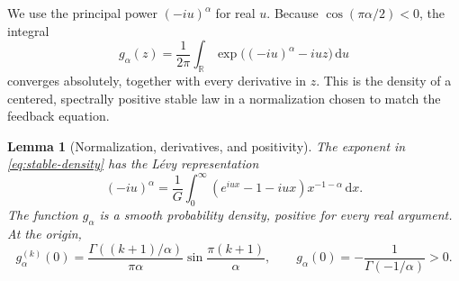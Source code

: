 \documentclass[11pt,a4paper]{article}
\numberwithin{equation}{section}
\newtheorem{lemma}[theorem]{Lemma}
\theoremstyle{definition}
\theoremstyle{remark}
\newcommand{\R}{\mathbb R}
\newcommand{\dd}{\,\mathrm d}
\begin{document}
We use the principal power $(-iu)^\alpha$ for real $u$. Because
$\cos(\pi\alpha/2)<0$, the integral
\begin{equation}\label{eq:stable-density}
 g_\alpha(z)=\frac1{2\pi}\int_{\R}
          \exp\bigl((-iu)^\alpha-iuz\bigr)\dd u
\end{equation}
converges absolutely, together with every derivative in $z$. This is the
density of a centered, spectrally positive stable law in a normalization
chosen to match the feedback equation.

\begin{lemma}[Normalization, derivatives, and positivity]
\label{lem:stable}
The exponent in \eqref{eq:stable-density} has the L\'evy representation
\begin{equation}\label{eq:levy}
 (-iu)^\alpha=\frac1G\int_0^\infty
       (e^{iux}-1-iux)x^{-1-\alpha}\dd x.
\end{equation}
The function $g_\alpha$ is a smooth probability density, positive for
every real argument. At the origin,
\begin{equation}\label{eq:stable-derivatives}
 g_\alpha^{(k)}(0)=\frac{\Gamma((k+1)/\alpha)}{\pi\alpha}
                   \sin\frac{\pi(k+1)}\alpha,
 \qquad
 g_\alpha(0)=-\frac1{\Gamma(-1/\alpha)}>0.
\end{equation}
\end{lemma}
\end{document}
